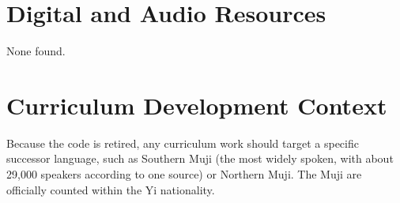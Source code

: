 \documentclass[12pt]{article}
\begin{document}
\section{Digital and Audio Resources}
None found.

\section{Curriculum Development Context}
Because the code is retired, any curriculum work should target a specific successor language, such as Southern Muji (the most widely spoken, with about 29,000 speakers according to one source) or Northern Muji. The Muji are officially counted within the Yi nationality.
\end{document}
